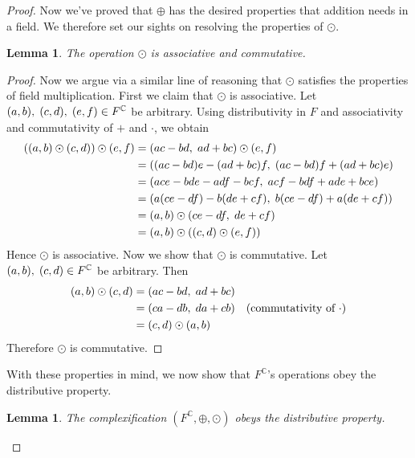 \documentclass[12pt]{article}
\newcommand{\C}{\mathbb{C}}
\newcommand{\ttc}{, \hspace{1mm}}
\theoremstyle{plain}
\newtheorem{lemma}[theorem]{Lemma}
\theoremstyle{definition}
\begin{document}
\begin{appendices}
\begin{proof}
Now we've proved that $\oplus$ has the desired properties that addition needs in a field. We therefore set our sights on resolving the properties of $\odot$.\\

\begin{lemma}
	The operation $\odot$ is associative and commutative.
\end{lemma}

\begin{proof}
	Now we argue via a similar line of reasoning that $\odot$ satisfies the properties of field multiplication. First we claim that $\odot$ is associative. Let $(a,b)\ttc(c,d)\ttc(e,f)\in F^\C$ be arbitrary. Using distributivity in $F$ and associativity and commutativity of $+$ and $\cdot$, we obtain
\begin{align*}
		((a,b)\odot(c,d))\odot(e,f) & = (ac - bd\ttc ad + bc)\odot (e,f)\\
		& = ((ac - bd)e - (ad + bc)f\ttc (ac - bd)f + (ad + bc)e)\\
		& = (ace - bde - adf - bcf\ttc acf - bdf + ade + bce)\\
		& = (a(ce - df) - b(de + cf)\ttc b(ce - df) + a(de + cf))\\
		& = (a,b)\odot (ce - df\ttc de + cf)\\
		& = (a,b)\odot ((c,d)\odot (e,f))
\end{align*}
Hence $\odot$ is associative. Now we show that $\odot$ is commutative. Let $(a,b)\ttc(c,d)\in F^\C$ be arbitrary. Then
	\begin{align*}
		(a,b)\odot (c,d) & = (ac - bd\ttc ad + bc)\\
		& = (ca - db\ttc da + cb) & \text{(commutativity of $\cdot$)}\\
		& = (c,d)\odot (a,b)
	\end{align*}
	Therefore $\odot$ is commutative.
\end{proof}

With these properties in mind, we now show that $F^\C$'s operations obey the distributive property.\\

\begin{lemma}
	The complexification $(F^\C,\oplus,\odot)$ obeys the distributive property.
\end{lemma}


\end{proof}
\end{appendices}
\end{document}
